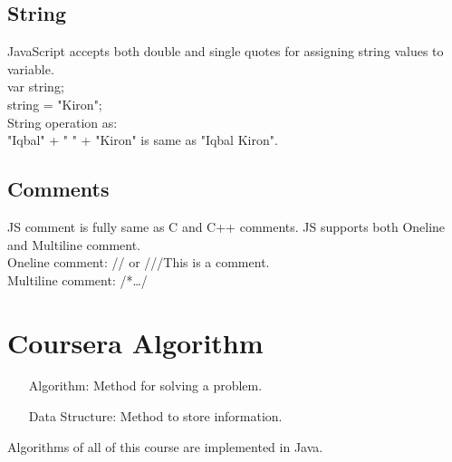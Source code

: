 \documentclass[11 pt]{book}
\begin{document}
\section{String}
JavaScript accepts both double and single quotes for assigning string values to variable.\\
var string;\\
string = "Kiron";\\
String operation as:\\
"Iqbal" + " " + "Kiron" is same as "Iqbal Kiron".
\section{Comments}
JS comment is fully same as C and C++ comments. JS supports both Oneline and Multiline comment.\\
Oneline comment: // or ///This is a comment.\\
Multiline comment: /*\dots*/

\chapter{Coursera Algorithm}
\begin{itemize}
	\item[Algorithm: ] Method for solving a problem.
	\item[Data Structure: ] Method to store information.
\end{itemize}
Algorithms of all of this course are implemented in Java.
\end{document}
